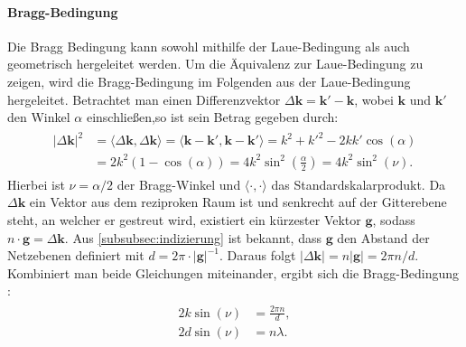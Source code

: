 \paragraph{Bragg-Bedingung}
Die Bragg Bedingung kann sowohl mithilfe der Laue-Bedingung als auch geometrisch hergeleitet werden.
Um die Äquivalenz zur Laue-Bedingung zu zeigen, wird die Bragg-Bedingung im Folgenden aus der Laue-Bedingung
hergeleitet.
Betrachtet man einen Differenzvektor $\Delta \mathbf{k}=\mathbf{k}'-\mathbf{k}$, wobei $\mathbf{k}$ und
$\mathbf{k'}$ den Winkel $\alpha$ einschließen,so ist sein Betrag gegeben durch:
\begin{align}
    \begin{split}
        \lvert \Delta \mathbf{k} \rvert ^{2}&=\langle \Delta \mathbf{k} ,\Delta \mathbf{k}\rangle =\langle
        \mathbf{k}-\mathbf{k}', \mathbf{k}-\mathbf{k}' \rangle = k^{2}+k'^{2}-2kk'\cos(\alpha)  \\
        &=2{k}^{2}(1-\cos(\alpha))=4k^{2}\sin ^{2}\left( \frac{\alpha}{2} \right)
        =4k^{2}\sin ^{2}( \nu).
    \end{split}
\end{align}
Hierbei ist $\nu = \alpha / 2$ der Bragg-Winkel und $\langle \cdot , \cdot \rangle$ das Standardskalarprodukt.
Da $\Delta \mathbf{k}$ ein Vektor aus dem reziproken Raum ist und senkrecht auf der Gitterebene
steht, an welcher er gestreut wird, existiert ein kürzester Vektor $\mathbf{g}$, sodass
$n\cdot \mathbf{g} =\Delta \mathbf{k}$.
Aus \cref{subsubsec:indizierung} ist bekannt, dass $\mathbf{g}$ den Abstand der Netzebenen definiert
mit $d = 2 \pi \cdot\lvert \mathbf{g} \rvert ^{-1}$.
Daraus folgt $\lvert \Delta \mathbf{k} \rvert=n \lvert \mathbf{g} \rvert = 2\pi n/d$.
Kombiniert man beide Gleichungen miteinander, ergibt sich die Bragg-Bedingung \autocite{Ashcroft}:
\begin{align}
    \begin{split}
        2k\sin(\nu)&=\frac{2\pi n}{d}, \\
        2d\sin(\nu)&=n \lambda.
    \end{split}
\end{align}

